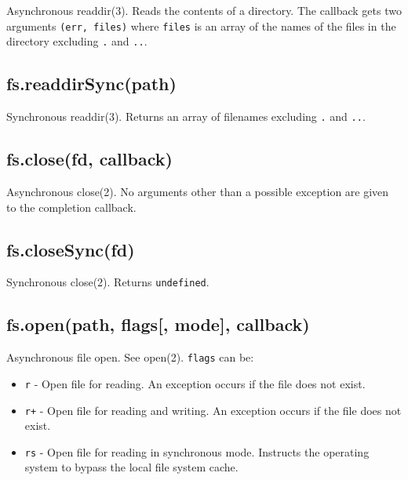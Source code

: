 Asynchronous readdir(3). Reads the contents of a directory. The callback
gets two arguments \texttt{(err,\ files)} where \texttt{files} is an
array of the names of the files in the directory excluding
\texttt{\textquotesingle{}.\textquotesingle{}} and
\texttt{\textquotesingle{}..\textquotesingle{}}.

\subsection{fs.readdirSync(path)}\label{fs.readdirsyncpath}

Synchronous readdir(3). Returns an array of filenames excluding
\texttt{\textquotesingle{}.\textquotesingle{}} and
\texttt{\textquotesingle{}..\textquotesingle{}}.

\subsection{fs.close(fd, callback)}\label{fs.closefd-callback}

Asynchronous close(2). No arguments other than a possible exception are
given to the completion callback.

\subsection{fs.closeSync(fd)}\label{fs.closesyncfd}

Synchronous close(2). Returns \texttt{undefined}.

\subsection{fs.open(path, flags{[}, mode{]},
callback)}\label{fs.openpath-flags-mode-callback}

Asynchronous file open. See open(2). \texttt{flags} can be:

\begin{itemize}
\item
  \texttt{\textquotesingle{}r\textquotesingle{}} - Open file for
  reading. An exception occurs if the file does not exist.
\item
  \texttt{\textquotesingle{}r+\textquotesingle{}} - Open file for
  reading and writing. An exception occurs if the file does not exist.
\item
  \texttt{\textquotesingle{}rs\textquotesingle{}} - Open file for
  reading in synchronous mode. Instructs the operating system to bypass
  the local file system cache.
\end{itemize}

